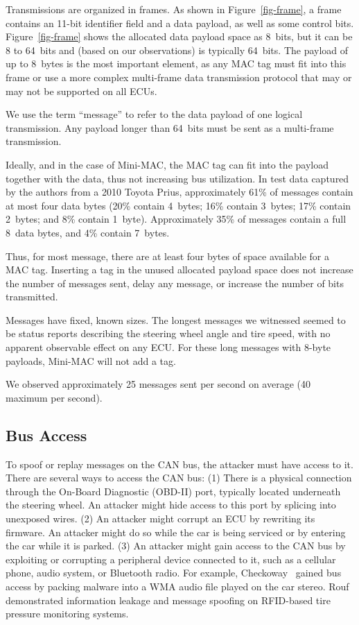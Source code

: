 Transmissions are organized in frames.  As shown in Figure~\ref{fig-frame}, 
a frame contains an 11-bit identifier field and 
a data payload, as well as some control bits. Figure~\ref{fig-frame} 
shows the allocated data payload space as 8~bits, but
it can be 8 to 64~bits and (based on our observations) is typically 64~bits.
The payload of up to 8~bytes is the most important element, 
as any MAC tag must fit into this frame or use a more complex multi-frame data transmission protocol 
that may or may not be supported on all ECUs. 

We use the term ``message'' to refer to the data payload of one logical transmission.
Any payload longer than 64~bits must be sent as a multi-frame transmission.

Ideally, and in the case of Mini-MAC, the MAC tag
can fit into the payload together with the data, thus not increasing bus utilization. 
In test data captured by the authors from a 2010 Toyota Prius, 
approximately 61\% of messages contain at most four data bytes
(20\% contain 4~bytes; 16\% contain 3~bytes; 17\% contain 2~bytes; and 8\% contain 1~byte).
Approximately 35\% of messages contain a full 8~data bytes, and 4\% contain 7~bytes.

Thus, for most message, there are at least four bytes of space available for a MAC tag.
Inserting a tag in the unused allocated payload space does not
increase the number of messages sent,
delay any message, 
or increase the number of bits transmitted.

Messages have fixed, known sizes.  The longest messages we witnessed
seemed to be status reports describing the steering wheel angle and tire speed,
with no apparent observable effect on any ECU.
For these long messages with 8-byte payloads,  Mini-MAC will not add a tag. 

We observed approximately 25 messages sent per second on average (40 maximum per second).

\subsection{Bus Access}
\label{access}

To spoof or replay messages on the CAN bus, the attacker must have access to it.
There are several ways to access the CAN bus:  (1) There is a
physical connection through the On-Board Diagnostic (OBD-II) port, 
typically located underneath the steering wheel.  An attacker might hide
access to this port by splicing into unexposed wires.
(2) An attacker might corrupt an ECU by rewriting its firmware. An attacker might
do so while the car is being serviced or by entering the car while it is parked.
(3) An attacker might gain access to the CAN bus by exploiting or corrupting a peripheral
device connected to it, such as a cellular phone, audio system, or Bluetooth
radio.  For example, Checkoway~\cite{Checkoway-2011} gained bus access by packing 
malware into a WMA audio file played on the car stereo. 
Rouf~\cite{Rouf2010} demonstrated information leakage and message spoofing on RFID-based tire pressure monitoring systems.

